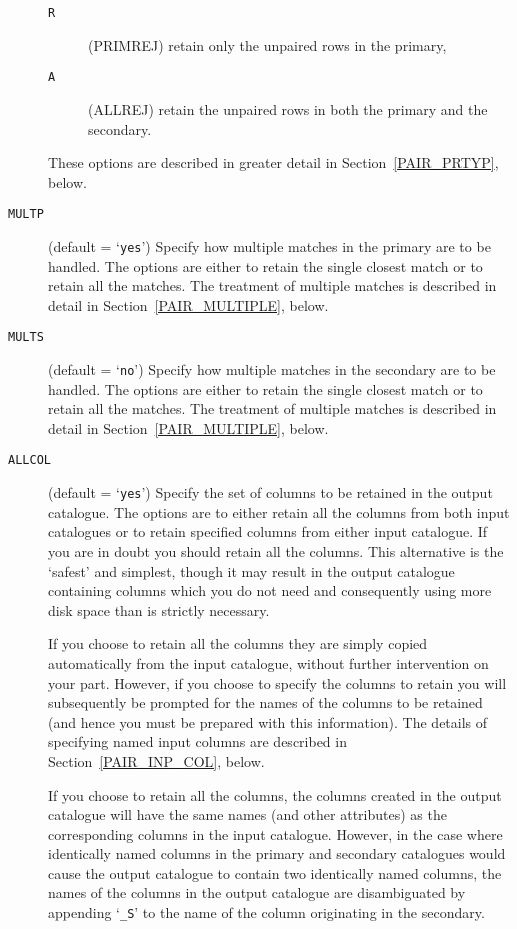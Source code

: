 \documentclass[twoside,11pt]{starlink}
\begin{document}
\begin{description}
\begin{description}
    \item[\texttt{R} ] (PRIMREJ) retain only the unpaired rows in the primary,

    \item[\texttt{A} ] (ALLREJ) retain the unpaired rows in both the primary
     and the secondary.

  \end{description}

   These options are described in greater detail in Section~\ref{PAIR_PRTYP},
   below.

  \item[ \texttt{MULTP} ] (default = `\texttt{yes}') Specify how multiple
   matches in the primary are to be handled. The options are either to
   retain the single closest match or to retain all the matches. The
   treatment of multiple matches is described in detail in
   Section~\ref{PAIR_MULTIPLE}, below.

  \item[ \texttt{MULTS} ] (default = `\texttt{no}') Specify how multiple
   matches in the secondary are to be handled. The options are either to
   retain the single closest match or to retain all the matches. The
   treatment of multiple matches is described in detail in
   Section~\ref{PAIR_MULTIPLE}, below.

  \item[ \texttt{ALLCOL} ] (default = `\texttt{yes}') Specify the set of
   columns to be retained in the output catalogue. The options are to either
   retain all the columns from both input catalogues or to retain specified
   columns from either input catalogue. If you are in doubt you should
   retain all the columns. This alternative is the `safest' and simplest,
   though it may result in the output catalogue containing columns which you
   do not need and consequently using more disk space than is strictly
   necessary.

   If you choose to retain all the columns they are simply copied
   automatically from the input catalogue, without further intervention on
   your part. However, if you choose to specify the columns to retain you
   will subsequently be prompted for the names of the columns to be retained
   (and hence you must be prepared with this information). The details of
   specifying named input columns are described in Section~\ref{PAIR_INP_COL},
   below.

   If you choose to retain all the columns, the columns created in the output
   catalogue will have the same names (and other attributes) as the
   corresponding columns in the input catalogue. However, in the case where
   identically named columns in the primary and secondary catalogues would
   cause the output catalogue to contain two identically named columns, the
   names of the columns in the output catalogue are disambiguated by
   appending `\texttt{\_S}' to the name of the column originating in the
   secondary.


\end{description}
\end{document}
